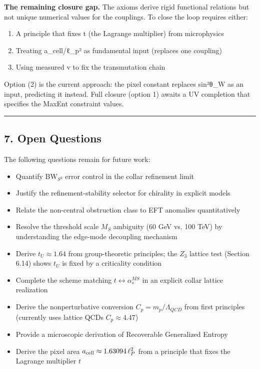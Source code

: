 \textbf{The remaining closure gap.} The axioms derive rigid functional relations but not unique numerical values for the couplings. To close the loop requires either:

\begin{enumerate}
\def\labelenumi{\arabic{enumi}.}
\tightlist
\item
  A principle that fixes t (the Lagrange multiplier) from microphysics
\item
  Treating a\_cell/ℓ\_p² as fundamental input (replaces one coupling)
\item
  Using measured v to fix the transmutation chain
\end{enumerate}

Option (2) is the current approach: the pixel constant replaces sin²θ\_W as an input, predicting it instead. Full closure (option 1) awaits a UV completion that specifies the MaxEnt constraint values.

\begin{center}\rule{0.5\linewidth}{0.5pt}\end{center}

\subsection{7. Open Questions}\label{7-open-questions}

The following questions remain for future work:

\begin{itemize}
\tightlist
\item
  Quantify BW\(_{S^2}\) error control in the collar refinement limit
\item
  Justify the refinement-stability selector for chirality in explicit models
\item
  Relate the non-central obstruction class to EFT anomalies quantitatively
\item
  Resolve the threshold scale \(M_S\) ambiguity (60 GeV vs. 100 TeV) by understanding the edge-mode decoupling mechanism
\item
  Derive \(t_U \approx 1.64\) from group-theoretic principles; the \(Z_3\) lattice test (Section 6.14) shows \(t_U\) is fixed by a criticality condition
\item
  Complete the scheme matching \(t \leftrightarrow \alpha_s^{\overline{MS}}\) in an explicit collar lattice realization
\item
  Derive the nonperturbative conversion \(C_p = m_p/\Lambda_{QCD}\) from first principles (currently uses lattice QCD\textquotesingle s \(C_p \approx 4.47\))
\item
  Provide a microscopic derivation of Recoverable Generalized Entropy
\item
  Derive the pixel area \(a_{\rm cell} \approx 1.63094\,\ell_P^2\) from a principle that fixes the Lagrange multiplier \(t\)
\end{itemize}

